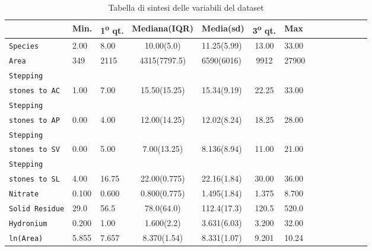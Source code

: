 \documentclass{article} %
\begin{document}
\begin{table}[H]
    \centering
    \renewcommand{\arraystretch}{1.4} %
    \begin{tabularx}{\textwidth}{p{69pt}l p{30pt}c p{45pt}c p{35pt}c p{40pt}c p{30pt}c p{27pt}r}
        \toprule
        & Min. & 1\textsuperscript{o} qt. & Mediana(IQR) & Media(sd) & 3\textsuperscript{o} qt. & Max\\
            \midrule  
            \texttt{Species} & 2.00 & 8.00 & 10.00(5.0) & 11.25(5.99) & 13.00 & 33.00 \\
            \texttt{Area} & 349 & 2115 & 4315(7797.5) & 6590(6016) & 9912 & 27900 \\
            \texttt{Stepping}\\ \texttt{stones to AC} & 1.00 & 7.00 & 15.50(15.25) & 15.34(9.19) & 22.25 & 33.00 \\
            \texttt{Stepping }\\
            \texttt{stones to AP} & 0.00 & 4.00 & 12.00(14.25) & 12.02(8.24) & 18.25 & 28.00 \\
            \texttt{Stepping }\\
            \texttt{stones to SV} & 0.00 & 5.00 & 7.00(13.25) & 8.136(8.94) & 11.00 & 21.00 \\
            \texttt{Stepping }\\
            \texttt{stones to SL} & 4.00 & 16.75 & 22.00(0.775) & 22.16(1.84) & 30.00 & 36.00 \\
            \texttt{Nitrate} & 0.100 & 0.600 & 0.800(0.775) & 1.495(1.84) & 1.375 & 8.700 \\
            \texttt{Solid Residue} & 29.0 & 56.5 & 78.0(64.0) & 112.4(17.3) & 120.5 & 520.0 \\
            \texttt{Hydronium} & 0.200 & 1.00 & 1.600(2.2) & 3.631(6.03) & 3.200 & 32.00 \\
            \texttt{ln(Area)} & 5.855 & 7.657 & 8.370(1.54) & 8.331(1.07) & 9.201 & 10.24 \\
        \bottomrule
    \end{tabularx}
    \caption{Tabella di sintesi delle variabili del dataset}
\end{table}
\end{document}

